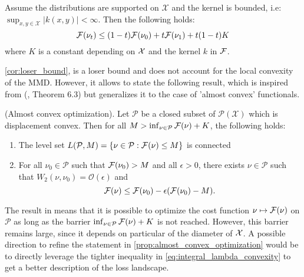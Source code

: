 \begin{corollary}
\label{cor:loser_bound}Assume the distributions are supported on
$\mathcal{X}$ and the kernel is bounded, i.e: $\sup_{x,y\in\mathcal{X}}\vert k(x,y)\vert<\infty$.
Then the following holds:
\begin{equation}
{{\mathcal F}}(\nu_{t})\leq(1-t){{\mathcal F}}(\nu_{0})+t{{\mathcal F}}(\nu_{1})+t(1-t)K
\end{equation}
where $K$ is a constant depending on ${{\mathcal X}}$ and the kernel $k$ in ${{\mathcal F}}$.
\end{corollary}
%
%
\cref{cor:loser_bound}, is a loser bound and does not account for the local
convexity of the MMD. However, it allows to state the following result,
which is inspired from (\cite{Bottou:2017}, Theorem 6.3) but generalizes
it to the case of 'almost convex' functionals.
\begin{proposition}
\label{prop:almost_convex_optimization}
(Almost convex optimization). Let $\mathcal{P}$ be a closed subset
of $\mathcal{P}(\mathcal{X})$ which is displacement convex. Then
for all $M>\inf_{\nu\in\mathcal{P}}{{\mathcal F}}(\nu)+K$, the following
holds:
\end{proposition}
\begin{enumerate}
\item The level set $L(\mathcal{P},M)=\{\nu\in\mathcal{P}:{{\mathcal F}}(\nu)\leq M\}$
is connected
\item For all $\nu_{0}\in\mathcal{P}$ such that ${{\mathcal F}}(\nu_0)>M$
and all $\epsilon>0$, there exists $\nu\in\mathcal{P}$ such that
$W_{2}(\nu,\nu_{0})=\mathcal{O}(\epsilon)$ and
\[
{{\mathcal F}}(\nu)\leq {{\mathcal F}}(\nu_{0})-\epsilon({{\mathcal F}}(\nu_{0})-M).
\]
\end{enumerate}
%
The result in  means that it is possible to optimize the cost function $\nu\mapsto {{\mathcal F}}(\nu)$
on $\mathcal{P}$ as long as the barrier $\inf_{\nu\in\mathcal{P}}{{\mathcal F}}(\nu)+K$
is not reached. However, this barrier remains large, since it depends on particular of the diameter of ${{\mathcal X}}$. A possible direction to refine the statement in \cref{prop:almost_convex_optimization} would be to directly leverage the tighter inequality in \cref{eq:integral_lambda_convexity} to get a better description of the loss landscape.


